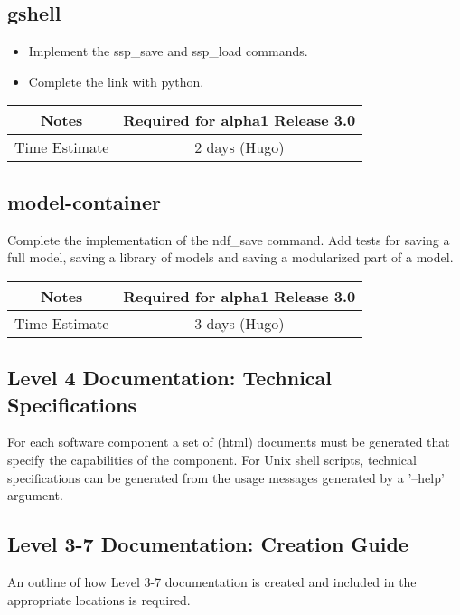 \documentclass[12pt]{article}
\begin{document}
\subsection{gshell}
\begin{itemize}
\item Implement the ssp\_save and ssp\_load commands.
\item Complete the link with python.
\end{itemize}

{
  \vspace{5mm}
  \centering
  \begin{tabular}{|c|c|}
    \hline
    Notes
    & Required for alpha1 Release 3.0 \\
    \hline
    Time Estimate
    & 2 days (Hugo) \\
    \hline
  \end{tabular}
}


\subsection{model-container}
Complete the implementation of the ndf\_save command.  Add tests for
saving a full model, saving a library of models and saving a
modularized part of a model.

{
  \vspace{5mm}
  \centering
  \begin{tabular}{|c|c|}
    \hline
    Notes
    & Required for alpha1 Release 3.0 \\
    \hline
    Time Estimate
    & 3 days (Hugo) \\
    \hline
  \end{tabular}
}


\subsection{Level 4 Documentation: Technical Specifications}

For each software component a set of (html) documents must be
generated that specify the capabilities of the component.  For Unix
shell scripts, technical specifications can be generated from the
usage messages generated by a '--help' argument.


\subsection{Level 3-7 Documentation: Creation Guide}

An outline of how Level 3-7 documentation is created and included in
the appropriate locations is required.
\end{document}
